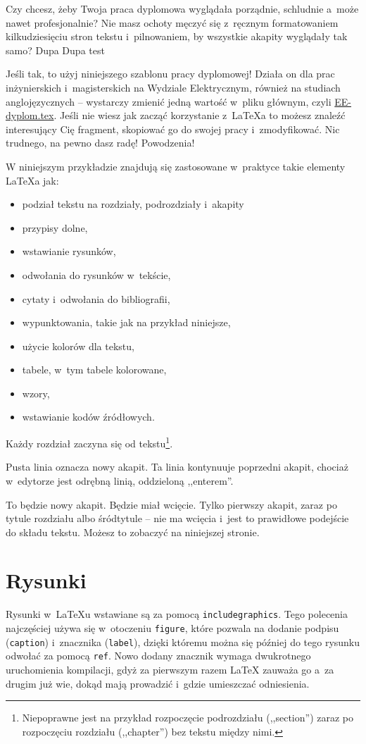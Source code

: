 Czy chcesz, żeby Twoja praca dyplomowa wyglądała porządnie, schludnie a~może nawet profesjonalnie? Nie masz ochoty męczyć się z~ręcznym formatowaniem kilkudziesięciu stron tekstu i~pilnowaniem, by wszystkie akapity wyglądały tak samo? Dupa Dupa test

Jeśli tak, to użyj niniejszego szablonu pracy dyplomowej! Działa on dla prac inżynierskich i~magisterskich na Wydziale Elektrycznym, również na studiach anglojęzycznych -- wystarczy zmienić jedną wartość w~pliku głównym, czyli \href{./EE-dyplom.tex}{EE-dyplom.tex}. Jeśli nie wiesz jak zacząć korzystanie z~\LaTeX{a} to możesz znaleźć interesujący Cię fragment, skopiować go do swojej pracy i~zmodyfikować. Nic trudnego, na pewno dasz radę! Powodzenia!

W niniejszym przykładzie znajdują się zastosowane w~praktyce takie elementy \LaTeX{a} jak:
\begin{itemize}
    \item podział tekstu na rozdziały, podrozdziały i~akapity
    \item przypisy dolne,
    \item wstawianie rysunków,
    \item odwołania do rysunków w~tekście,
    \item cytaty i~odwołania do bibliografii,
    \item wypunktowania, takie jak na przykład niniejsze,
    \item użycie kolorów dla tekstu,
    \item tabele, w~tym tabele kolorowane, %
    \item wzory, %
    \item wstawianie kodów źródłowych.
\end{itemize}

Każdy rozdział zaczyna się od tekstu\footnote{Niepoprawne jest na przykład rozpoczęcie podrozdziału (,,section'') zaraz po rozpoczęciu rozdziału (,,chapter'') bez tekstu między nimi.}.

Pusta linia oznacza nowy akapit.
Ta linia kontynuuje poprzedni akapit, chociaż w~edytorze jest odrębną linią, oddzieloną ,,enterem''.

To będzie nowy akapit. Będzie miał wcięcie. Tylko pierwszy akapit, zaraz po tytule rozdziału albo śródtytule -- nie ma wcięcia i~jest to prawidłowe podejście do składu tekstu. Możesz to zobaczyć na niniejszej stronie.

\section{Rysunki}
Rysunki w~\LaTeX{u} wstawiane są za pomocą \texttt{includegraphics}. Tego polecenia najczęściej używa się w~otoczeniu \texttt{figure}, które pozwala na dodanie podpisu (\texttt{caption}) i~znacznika (\texttt{label}), dzięki któremu można się później do tego rysunku odwołać za pomocą \texttt{ref}. Nowo dodany znacznik wymaga dwukrotnego uruchomienia kompilacji, gdyż za pierwszym razem \LaTeX{} zauważa go a~za drugim już wie, dokąd mają prowadzić i~gdzie umieszczać odniesienia.

